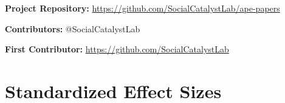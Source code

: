 \documentclass[12pt]{article}
\begin{document}
\noindent\textbf{Project Repository:} \url{https://github.com/SocialCatalystLab/ape-papers}

\noindent\textbf{Contributors:} @SocialCatalystLab

\noindent\textbf{First Contributor:} \url{https://github.com/SocialCatalystLab}

\label{apep_main_text_end}
\newpage


\newpage
\appendix

\section{Standardized Effect Sizes}
\label{sec:sde}


\end{document}
